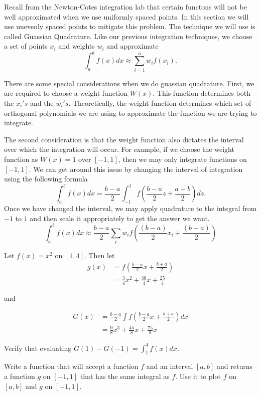 \label{Lab:GaussQuad}

Recall from the Newton-Cotes integration lab that certain functons will not be well approximated when we use uniformly spaced points.
In this section we will use unevenly spaced points to mitigate this problem.
The technique we will use is called Guassian Quadrature.
Like our previous integration techniques, we choose a set of points $x_i$ and weights $w_i$ and approximate
\[
\int_{a}^b f(x) dx \approx \sum_{i=1}^n w_if(x_i).
\]

There are some special considerations when we do guassian quadrature.
First, we are required to choose a weight function $W(x)$.
This function determines both the $x_i's$ and the $w_i's$.
Theoretically, the weight function determines which set of orthogonal polynomials we are using to approximate the function we are trying to integrate.

The second consideration is that the weight function also dictates the interval over which the integration will occur.
For example, if we choose the weight function as $W(x) = 1$ over $[-1,1]$, then we may only integrate functions on $[-1,1]$.
We can get around this issue by changing the interval of integration using the following formula
\[
\int_a^b f(x) dx = \frac{b-a}{2}\int_{-1}^1 f(\frac{b-a}{2}z + \frac{a+b}{2})dz.
\]
Once we have changed the interval, we may apply quadrature to the integral from $-1$ to $1$ and then scale it appropriately to get the answer we want.
\[
\int_a^b f(x) dx \approx \frac{b - a}{2} \sum_i w_if(\frac{(b-a)}{2}x_i + \frac{(b+a)}{2})
\]

\begin{problem}
Let $f(x) = x^2$ on $[1,4]$.  Then let
\begin{align*}
g(x) &= f(\frac{b-a}{2}x + \frac{b+a}{2}) \\
&= \frac{3}{4}x^2 + \frac{30}{4}x + \frac{25}{4}
\end{align*}

and

\begin{align*}
G(x) &= \frac{b - a}{2} \int f(\frac{b - a}{2} x + \frac{b + a}{2})dx \\
&= \frac{9}{8}x^3 + \frac{45}{8}x + \frac{75}{8}x
\end{align*}

Verify that evaluating $G(1) - G(-1) = \int_1^4 f(x)dx$.

Write a function that will accept a function $f$ and an interval $[a,b]$ and returns a function $g$ on $[-1,1]$ that has the same integral as $f$.
Use it to plot $f$ on $[a,b]$ and $g$ on $[-1,1]$.
\end{problem}

